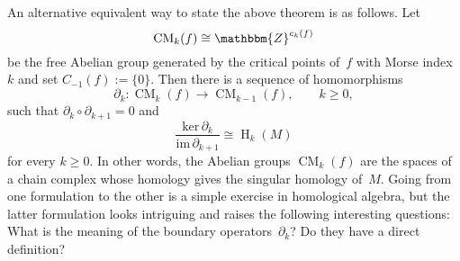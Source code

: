 \documentclass[12pt,twoside]{amsart}
\theoremstyle{plain}
\numberwithin{figure}{section}
\numberwithin{equation}{section}
\def\H{\operatorname{H}}
\def\CM{\operatorname{CM}}
\def\ZZ{\mathbbm{Z}}
\begin{document}
An alternative equivalent way to state the above theorem is as follows. Let 
\[
\CM_k(f) \cong  \ZZ^{c_k(f)}
\]
be the free Abelian group generated by the critical points of~$f$ with Morse index~$k$ 
and set $C_{-1}(f):= \{0\}$. Then there is a sequence of homomorphisms
\[
\partial_k \colon \CM_k(f) \rightarrow \CM_{k-1}(f), \qquad k\geqslant 0,
\]
such that $\partial_k \circ \partial_{k+1}=0$ and
\[
\frac{\mathrm{ker} \,\partial_k}{\mathrm{im}\, \partial_{k+1}} \cong \H_k(M)
\]
for every $k \geqslant 0$.
In other words, the Abelian groups $\CM_k(f)$ are the spaces of a chain complex whose homology gives the singular homology of~$M$. Going from one formulation to the other is a simple exercise in homological algebra, but the latter formulation looks intriguing and raises the following interesting questions: What is the meaning of the boundary operators~$\partial_k$?  
Do they have a direct definition?
\end{document}
